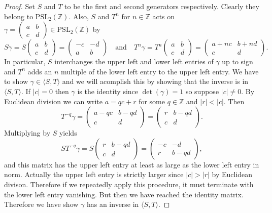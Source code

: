 \documentclass[12pt]{book}
\theoremstyle{definition}\newframedtheorem{method}{Method}
\newcommand{\PSL}{\mathrm{PSL}}
\newcommand{\Z}{\mathbb{Z}}
\newcommand{\g}{\gamma}
\newcommand{\<}{\langle}
\renewcommand{\>}{\rangle}
\begin{document}
      \begin{proof}
        Set $S$ and $T$ to be the first and second generators respectively. Clearly they belong to $\PSL_{2}(\Z)$. Also, $S$ and $T^{n}$ for $n \in \Z$ acts on $\g = \begin{pmatrix} a & b \\ c & d \end{pmatrix} \in \PSL_{2}(\Z)$ by
        \[
          S\g = S\begin{pmatrix} a & b \\ c & d \end{pmatrix} = \begin{pmatrix} -c & -d \\ a & b \end{pmatrix} \quad \text{and} \quad T^{n}\g = T^{n}\begin{pmatrix} a & b \\ c & d \end{pmatrix} = \begin{pmatrix} a+nc & b+nd \\ c & d \end{pmatrix}.
        \]
        In particular, $S$ interchanges the upper left and lower left entries of $\g$ up to sign and $T^{n}$ adds an $n$ multiple of the lower left entry to the upper left entry. We have to show $\g \in \<S,T\>$ and we will acomplish this by showing that the inverse is in $\<S,T\>$. If $|c| = 0$ then $\g$ is the identity since $\det(\g) = 1$ so suppose $|c| \neq 0$. By Euclidean division we can write $a = qc+r$ for some $q \in \Z$ and $|r| < |c|$. Then
        \[
          T^{-q}\g = \begin{pmatrix} a-qc & b-qd \\ c & d \end{pmatrix} = \begin{pmatrix} r & b-qd \\ c & d \end{pmatrix}.
        \]
        Multiplying by $S$ yields
        \[
          ST^{-q}\g = S\begin{pmatrix} r & b-qd \\ c & d \end{pmatrix} = \begin{pmatrix} -c & -d \\ r & b-qd \end{pmatrix},
        \]
        and this matrix has the upper left entry at least as large as the lower left entry in norm. Actually the upper left entry is strictly larger since $|c| > |r|$ by Euclidean divison. Therefore if we repeatedly apply this procedure, it must terminate with the lower left entry vanishing. But then we have reached the identity matrix. Therefore we have show $\g$ has an inverse in $\<S,T\>$.
      \end{proof}
\end{document}
